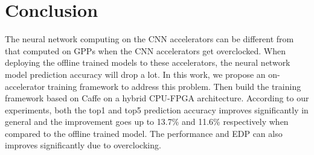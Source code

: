 \section{Conclusion} \label{sec:Conclusion}
The neural network computing on the CNN accelerators 
can be different from that computed on GPPs when the 
CNN accelerators get overclocked. When deploying the offline
trained models to these accelerators, the neural network model 
prediction accuracy will drop a lot. In this work, we propose an 
on-accelerator training framework to address this problem.
Then build the training framework based on Caffe on a 
hybrid CPU-FPGA architecture. According to our 
experiments, both the top1 and top5 prediction 
accuracy improves significantly in general and the improvement goes 
up to 13.7\% and 11.6\% respectively when compared to the 
offline trained model. The performance and EDP can also improves 
significantly due to overclocking.



